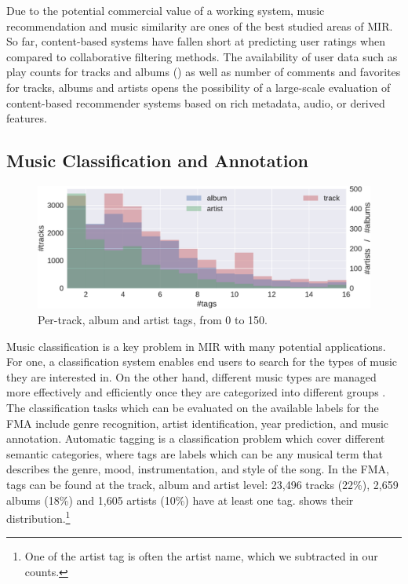 \documentclass{article}
\begin{document}
Due to the potential commercial value of a working system, music recommendation and music similarity are ones of the best studied areas of MIR. So far, content-based systems have fallen short at predicting user ratings when compared to collaborative filtering methods.
The availability of user data such as play counts for tracks and albums () as well as number of comments and favorites for tracks, albums and artists opens the possibility of a large-scale evaluation of content-based recommender systems based on rich metadata, audio, or derived features.

\subsection{Music Classification and Annotation}

\begin{figure}
	\centering
	\includegraphics[width=\linewidth]{tag_distribution.pdf}
	\caption{Per-track, album and artist tags, from 0 to 150.}
	\label{fig:tag_distribution}
\end{figure}

Music classification is a key problem in MIR with many potential applications. For one, a classification system enables end users to search for the types of music they are interested in. On the other hand, different music types are managed more effectively and efficiently once they are categorized into different groups \cite{mir_review_classif}.
The classification tasks which can be evaluated on the available labels for the FMA include genre recognition, artist identification, year prediction, and music annotation. Automatic tagging is a classification problem which cover different semantic categories, where tags are labels which can be any musical term that describes the genre, mood, instrumentation, and style of the song.
In the FMA, tags can be found at the track, album and artist level: 23,496 tracks (22\%), 2,659 albums (18\%) and 1,605 artists (10\%) have at least one tag.  shows their distribution.\footnote{One of the artist tag is often the artist name, which we subtracted in our counts.}
\end{document}
